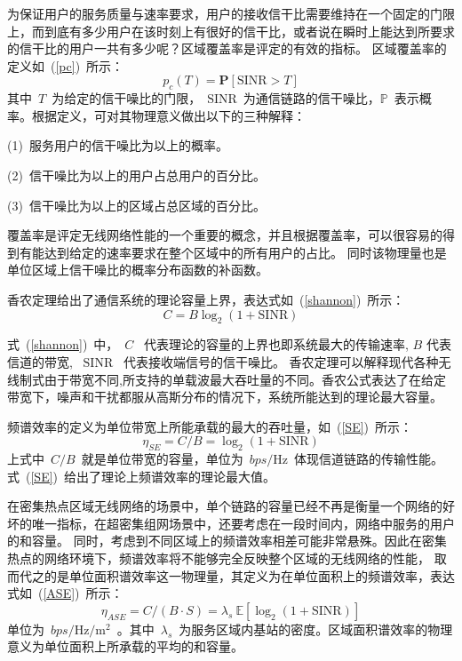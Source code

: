 为保证用户的服务质量与速率要求，用户的接收信干比需要维持在一个固定的门限上，而到底有多少用户在该时刻上有很好的信干比，或者说在瞬时上能达到所要求的信干比的用户一共有多少呢？区域覆盖率是评定的有效的指标。
区域覆盖率的定义如~(\ref{pc})~所示：
\begin{equation}\label{pc}
  p_c(T) = \mathbf{P}[\mathrm{SINR}>T]
\end{equation}
其中~$T$~为给定的信干噪比的门限，~$\mathrm{SINR}$~为通信链路的信干噪比，$\mathbb{P}$~表示概率。根据定义，可对其物理意义做出以下的三种解释：

 (1)~服务用户的信干噪比为以上的概率。

 (2)~信干噪比为以上的用户占总用户的百分比。

 (3)~信干噪比为以上的区域占总区域的百分比。

覆盖率是评定无线网络性能的一个重要的概念，并且根据覆盖率，可以很容易的得到有能达到给定的速率要求在整个区域中的所有用户的占比。
同时该物理量也是单位区域上信干噪比的概率分布函数的补函数。

香农定理给出了通信系统的理论容量上界，表达式如~(\ref{shannon})~所示：
\begin{equation}\label{shannon}
  C = B \log_2(1+\mathrm{SINR})
\end{equation}

式~(\ref{shannon})~中，~$C$~ 代表理论的容量的上界也即系统最大的传输速率, $B$ 代表信道的带宽, ~$\mathrm{SINR}$~ 代表接收端信号的信干噪比。
香农定理可以解释现代各种无线制式由于带宽不同,所支持的单载波最大吞吐量的不同。香农公式表达了在给定带宽下，噪声和干扰都服从高斯分布的情况下，系统所能达到的理论最大容量。

频谱效率的定义为单位带宽上所能承载的最大的吞吐量，如~(\ref{SE})~所示：
\begin{equation}\label{SE}
\eta_{SE}=C/B=\log_2(1+\mathrm{SINR})
\end{equation}
上式中~$C/B$~就是单位带宽的容量，单位为~$bps/\mathrm{Hz}$~体现信道链路的传输性能。式~(\ref{SE})~给出了理论上频谱效率的理论最大值。

在密集热点区域无线网络的场景中，单个链路的容量已经不再是衡量一个网络的好坏的唯一指标，在超密集组网场景中，还要考虑在一段时间内，网络中服务的用户的和容量。
同时，考虑到不同区域上的频谱效率相差可能非常悬殊。因此在密集热点的网络环境下，频谱效率将不能够完全反映整个区域的无线网络的性能，
取而代之的是单位面积谱效率这一物理量，其定义为在单位面积上的频谱效率，表达式如~(\ref{ASE})~所示：
\begin{equation}\label{ASE}
  \eta_{ASE}=C/(B\cdot S) = \lambda_s~\mathbb{E}[\log_2(1+\mathrm{SINR})]
\end{equation}
单位为~$bps/\mathrm{Hz}/\mathrm{m}^2$~。其中~$\lambda_s$~为服务区域内基站的密度。区域面积谱效率的物理意义为单位面积上所承载的平均的和容量。

